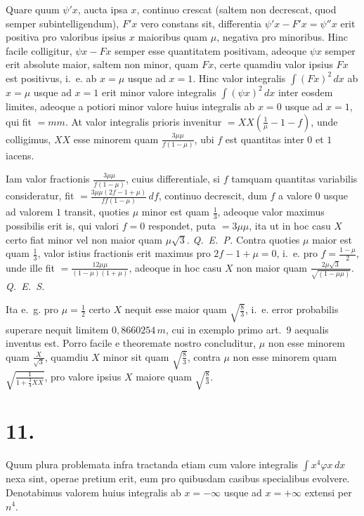 \documentclass[12pt,a4paper]{book}
\begin{document}
Quare quum $\psi'x$, aucta ipsa $x$, continuo crescat (saltem non decrescat, quod semper subintelligendum), $F'x$ vero constans sit, differentia $\psi'x-F'x=\psi''x$ erit positiva pro valoribus ipsius $x$ maioribus quam $\mu$, negativa pro minoribus. Hinc facile colligitur, $\psi x-Fx$ semper esse quantitatem positivam, adeoque $\psi x$ semper erit absolute maior, saltem non minor, quam $Fx$, certe quamdiu valor ipsius $Fx$ est positivus, i.~e. ab $x=\mu$ usque ad $x=1$. Hinc valor integralis $\int(Fx)^2\,dx$ ab $x=\mu$ usque ad $x=1$ erit minor valore integralis $\int(\psi x)^2\,dx$ inter eosdem limites, adeoque a potiori minor valore huius integralis ab $x=0$ usque ad $x=1$, qui fit $=mm$. At valor integralis prioris invenitur $=XX(\tfrac{1}{\mu}-1-f)$, unde colligimus, $XX$ esse minorem quam $\tfrac{3\mu\mu}{f(1-\mu)}$, ubi $f$ est quantitas inter $0$ et $1$ iacens.

Iam valor fractionis $\tfrac{3\mu\mu}{f(1-\mu)}$, cuius differentiale, si $f$ tamquam quantitas variabilis consideratur, fit $=\tfrac{3\mu\mu(2f-1+\mu)}{ff(1-\mu)}\,df$, continuo decrescit, dum $f$ a valore $0$ usque ad valorem $1$ transit, quoties $\mu$ minor est quam $\tfrac{1}{3}$, adeoque valor maximus possibilis erit is, qui valori $f=0$ respondet, puta $=3\mu\mu$, ita ut in hoc casu $X$ certo fiat minor vel non maior quam $\mu\sqrt{3}$. \textit{Q.~E.~P.} Contra quoties $\mu$ maior est quam $\tfrac{1}{3}$, valor istius fractionis erit maximus pro $2f-1+\mu=0$, i.~e. pro $f=\tfrac{1-\mu}{2}$, unde ille fit $=\tfrac{12\mu\mu}{(1-\mu)(1+\mu)}$, adeoque in hoc casu $X$ non maior quam $\tfrac{2\mu\sqrt{3}}{\sqrt{(1-\mu\mu)}}$. \textit{Q.~E.~S.}

Ita e.~g. pro $\mu=\tfrac{1}{2}$ certo $X$ nequit esse maior quam $\sqrt{\tfrac{8}{3}}$, i.~e. error probabilis superare nequit limitem $0{,}8660254\,m$, cui in exemplo primo art.~9 aequalis inventus est. Porro facile e theoremate nostro concluditur, $\mu$ non esse minorem quam $\tfrac{X}{\sqrt{3}}$, quamdiu $X$ minor sit quam $\sqrt{\tfrac{8}{3}}$, contra $\mu$ non esse minorem quam $\sqrt{\tfrac{1}{1+\tfrac{3}{4}XX}}$, pro valore ipsius $X$ maiore quam $\sqrt{\tfrac{8}{3}}$.

\section*{11.}
\label{sec:art11}

Quum plura problemata infra tractanda etiam cum valore integralis $\int x^4\varphi x\,dx$ nexa sint, operae pretium erit, eum pro quibusdam casibus specialibus evolvere. Denotabimus valorem huius integralis ab $x=-\infty$ usque ad $x=+\infty$ extensi per $n^4$.
\end{document}
